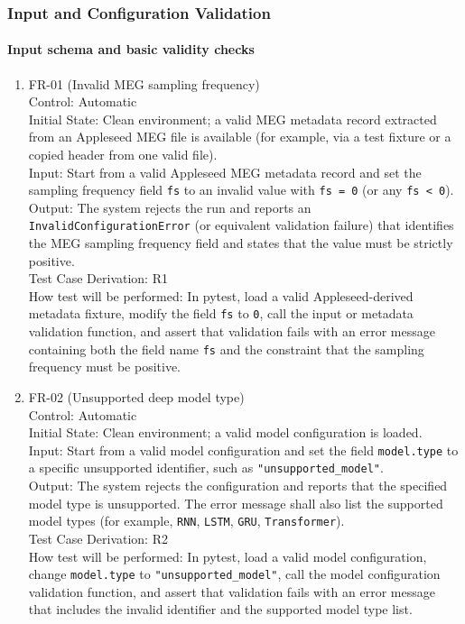 \documentclass[12pt, titlepage]{article}
\begin{document}
\subsubsection{Input and Configuration Validation}

\paragraph{Input schema and basic validity checks}


\begin{enumerate}

\item{FR-01 (Invalid MEG sampling frequency)\\}
Control: Automatic \\
Initial State: Clean environment; a valid MEG metadata record extracted from an
Appleseed MEG file is available (for example, via a test fixture or a copied
header from one valid file). \\
Input: Start from a valid Appleseed MEG metadata record and set the sampling
frequency field \texttt{fs} to an invalid value with \texttt{fs = 0}
(or any \texttt{fs < 0}). \\
Output: The system rejects the run and reports an
\texttt{InvalidConfigurationError} (or equivalent validation failure) that
identifies the MEG sampling frequency field and states that the value must be
strictly positive. \\
Test Case Derivation: R1 \\
How test will be performed: In pytest, load a valid Appleseed-derived metadata
fixture, modify the field \texttt{fs} to \texttt{0}, call the input or metadata
validation function, and assert that validation fails with an error message
containing both the field name \texttt{fs} and the constraint that the sampling
frequency must be positive.


\item{FR-02 (Unsupported deep model type)\\}
Control: Automatic \\
Initial State: Clean environment; a valid model configuration is loaded. \\
Input: Start from a valid model configuration and set the field
\texttt{model.type} to a specific unsupported identifier, such as
\texttt{"unsupported\_model"}. \\
Output: The system rejects the configuration and reports that the specified
model type is unsupported. The error message shall also list the supported model
types (for example, \texttt{RNN}, \texttt{LSTM}, \texttt{GRU},
\texttt{Transformer}). \\
Test Case Derivation: R2 \\
How test will be performed: In pytest, load a valid model configuration, change
\texttt{model.type} to \texttt{"unsupported\_model"}, call the model
configuration validation function, and assert that validation fails with an
error message that includes the invalid identifier and the supported model type
list.


\end{enumerate}
\end{document}
